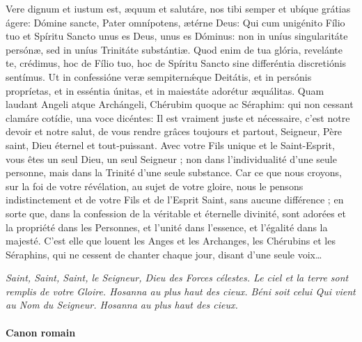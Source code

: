\documentclass[twoside]{article}
\begin{document}
\begin{paracol}{2}

Vere dignum et iustum est, æquum et salutáre, nos tibi semper et ubíque grátias ágere: Dómine sancte, Pater omnípotens, ætérne Deus: Qui cum unigénito Fílio tuo et Spíritu Sancto unus es Deus, unus es Dóminus: non in uníus singularitáte persónæ, sed in uníus Trinitáte substántiæ. Quod enim de tua glória, revelánte te, crédimus, hoc de Fílio tuo, hoc de Spíritu Sancto sine differéntia discretiónis sentímus. Ut in confessióne veræ sempiternǽque Deitátis, et in persónis propríetas, et in esséntia únitas, et in maiestáte adorétur æquálitas. Quam laudant Angeli atque Archángeli, Chérubim quoque ac Séraphim: qui non cessant clamáre cotídie, una voce dicéntes:
\switchcolumn
Il est vraiment juste et nécessaire, c’est notre devoir et notre salut, de vous rendre grâces toujours et partout, Seigneur, Père saint, Dieu éternel et tout‑puissant. Avec votre Fils unique et le Saint-Esprit, vous êtes un seul Dieu, un seul Seigneur ; non dans l’individualité d’une seule personne, mais dans la Trinité d’une seule substance. Car ce que nous croyons, sur la foi de votre révélation, au sujet de votre gloire, nous le pensons indistinctement et de votre Fils et de l’Esprit Saint, sans aucune différence ; en sorte que, dans la confession de la véritable et éternelle divinité, sont adorées et la propriété dans les Personnes, et l’unité dans l’essence, et l’égalité dans la majesté. C’est elle que louent les Anges et les Archanges, les Chérubins et les Séraphins, qui ne cessent de chanter chaque jour, disant d’une seule voix…
\end{paracol}
\emph{Saint, Saint, Saint, le Seigneur, Dieu des Forces célestes. Le ciel et la terre sont remplis de votre Gloire. Hosanna au plus haut des cieux.
Béni soit celui Qui vient au Nom du Seigneur. Hosanna au plus haut des cieux.}
\newpage
\paragraph{Canon romain}
\end{document}
